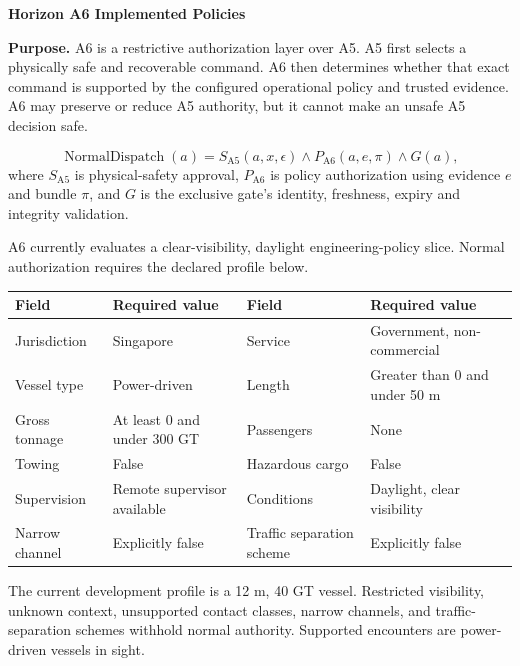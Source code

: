 \documentclass[10pt,a4paper,twoside]{article}
\newcommand{\sectionbar}[1]{\vspace{4pt}{\large\bfseries\color{hnavy}#1}\par\vspace{-2pt}{\color{hblue}\rule{\textwidth}{0.7pt}}\vspace{2pt}}
\newcommand{\modelbox}[1]{\begingroup\setlength{\fboxsep}{8pt}\colorbox{hpale}{\parbox{\dimexpr\textwidth-2\fboxsep\relax}{#1}}\endgroup}
\begin{document}
\begin{center}
  {\color{hnavy}\fontsize{24}{28}\selectfont\bfseries Horizon A6 Implemented Policies}\par
  \par
  \vspace{8pt}{\small Technical note based on the current Horizon implementation \textbar\ September 2026}
\end{center}

\modelbox{\textbf{Purpose.} A6 is a restrictive authorization layer over A5. A5 first selects a physically safe and recoverable command. A6 then determines whether that exact command is supported by the configured operational policy and trusted evidence. A6 may preserve or reduce A5 authority, but it cannot make an unsafe A5 decision safe.}

\begin{equation}
  \operatorname{NormalDispatch}(a)=S_{\mathrm{A5}}(a,x,\epsilon)
  \land P_{\mathrm{A6}}(a,e,\pi)\land G(a),
\end{equation}
where $S_{\mathrm{A5}}$ is physical-safety approval, $P_{\mathrm{A6}}$ is policy authorization using evidence $e$ and bundle $\pi$, and $G$ is the exclusive gate's identity, freshness, expiry and integrity validation.

\sectionbar{1. Bounded operational scope}
A6 currently evaluates a clear-visibility, daylight engineering-policy slice. Normal authorization requires the declared profile below.
\begin{center}\small
\begin{tabularx}{\textwidth}{@{}lYlY@{}}
\toprule
Field & Required value & Field & Required value \\
\midrule
Jurisdiction & Singapore & Service & Government, non-commercial \\
Vessel type & Power-driven & Length & Greater than 0 and under 50 m \\
Gross tonnage & At least 0 and under 300 GT & Passengers & None \\
Towing & False & Hazardous cargo & False \\
Supervision & Remote supervisor available & Conditions & Daylight, clear visibility \\
Narrow channel & Explicitly false & Traffic separation scheme & Explicitly false \\
\bottomrule
\end{tabularx}
\end{center}
The current development profile is a 12 m, 40 GT vessel. Restricted visibility, unknown context, unsupported contact classes, narrow channels, and traffic-separation schemes withhold normal authority. Supported encounters are power-driven vessels in sight.
\end{document}
